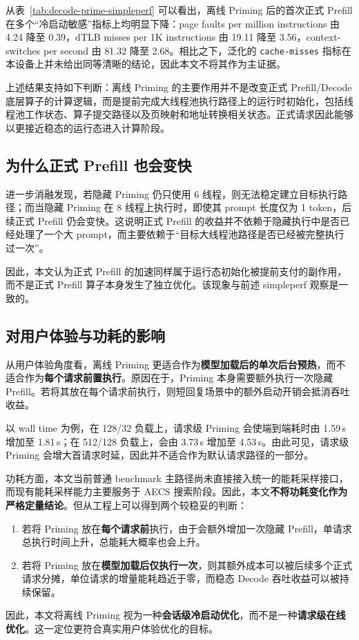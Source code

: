 从表~\ref{tab:decode-prime-simpleperf} 可以看出，离线 Priming 后的首次正式 Prefill 在多个“冷启动敏感”指标上均明显下降：page faults per million instructions 由 4.24 降至 0.39，dTLB misses per 1K instructions 由 19.11 降至 3.56，context-switches per second 由 81.32 降至 2.68。相比之下，泛化的 \texttt{cache-misses} 指标在本设备上并未给出同等清晰的结论，因此本文不将其作为主证据。

上述结果支持如下判断：离线 Priming 的主要作用并不是改变正式 Prefill/Decode 底层算子的计算逻辑，而是提前完成大线程池执行路径上的运行时初始化，包括线程池工作状态、算子提交路径以及页映射和地址转换相关状态。正式请求因此能够以更接近稳态的运行态进入计算阶段。

\subsection{为什么正式 Prefill 也会变快}

进一步消融发现，若隐藏 Priming 仍只使用 6 线程，则无法稳定建立目标执行路径；而当隐藏 Priming 在 8 线程上执行时，即使其 prompt 长度仅为 1 token，后续正式 Prefill 仍会变快。这说明正式 Prefill 的收益并不依赖于隐藏执行中是否已经处理了一个大 prompt，而主要依赖于“目标大线程池路径是否已经被完整执行过一次”。

因此，本文认为正式 Prefill 的加速同样属于运行态初始化被提前支付的副作用，而不是正式 Prefill 算子本身发生了独立优化。该现象与前述 simpleperf 观察是一致的。

\subsection{对用户体验与功耗的影响}

从用户体验角度看，离线 Priming 更适合作为\textbf{模型加载后的单次后台预热}，而不适合作为\textbf{每个请求前置执行}。原因在于，Priming 本身需要额外执行一次隐藏 Prefill。若将其放在每个请求前执行，则短回复场景中的额外启动开销会抵消吞吐收益。

以 wall time 为例，在 128/32 负载上，请求级 Priming 会使端到端耗时由 1.59\,s 增加至 1.81\,s；在 512/128 负载上，会由 3.73\,s 增加至 4.53\,s。由此可见，请求级 Priming 会增大首请求时延，因此并不适合作为默认请求路径的一部分。

功耗方面，本文当前普通 benchmark 主路径尚未直接接入统一的能耗采样接口，而现有能耗采样能力主要服务于 AECS 搜索阶段。因此，本文\textbf{不将功耗变化作为严格定量结论}。但从工程上可以得到两个较稳妥的判断：

\begin{enumerate}
  \item 若将 Priming 放在\textbf{每个请求前}执行，由于会额外增加一次隐藏 Prefill，单请求总执行时间上升，总能耗大概率也会上升。
  \item 若将 Priming 放在\textbf{模型加载后仅执行一次}，则其额外成本可以被后续多个正式请求分摊，单位请求的增量能耗趋近于零，而稳态 Decode 吞吐收益可以被持续保留。
\end{enumerate}

因此，本文将离线 Priming 视为一种\textbf{会话级冷启动优化}，而不是一种\textbf{请求级在线优化}。这一定位更符合真实用户体验优化的目标。

